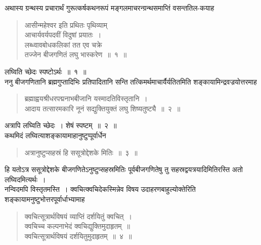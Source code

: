 \documentclass[11pt, openany]{book}
\begin{document}
अथास्य ग्रन्थस्य प्रचारार्थं गुरूत्कर्षकथनरूपं मङ्गलमाचरन्ग्रन्थसमाप्तिं
वसन्ततिल-कयाह\textendash
\begin{quote}
    \ab 
     आसीन्महेश्वर इति प्रथितः पृथिव्याम्\\
 आचार्यवर्यपदवीं विदुषां प्रयातः~।\\
 लब्ध्वावबोधकलिकां तत एव चक्रे\\
 तज्जेन बीजगणितं लघु भास्करेण~॥~१~॥
\end{quote}

लघ्विति च्छेदः स्पष्टोऽर्थः~॥~१~॥~\\

\vspace{-2mm}
 ननु बीजगणितानि ब्रह्मगुप्तादिभिः प्रतिपादितानि सन्ति
तत्किमर्थमाचार्यैर्यतितमिति शङ्कायामिन्द्रवज्रयोत्तरमाह\textendash
\begin{quote}
    \ab 
     ब्रह्माह्वयश्रीधरपद्मनाभबीजानि यस्मादतिविस्तृतानि~।\\
 आदाय तत्सारमकारि नूनं सद्युक्तियुक्तं लघु शिष्यतुष्ट्यै~॥~२~॥~
\end{quote}

अत्रापि लघ्विति च्छेदः~। शेषं स्पष्टम्~॥~२~॥~\\

\vspace{-2mm}
 कथमिदं लघ्वित्याशङ्कायामाहानुष्टुप्पूर्वार्धेन\textendash
\begin{quote}
    \ab 
     अत्रानुष्टुप्सहस्रं हि ससूत्रोद्देशके मितिः~॥~३~॥
\end{quote}

 हि यतोऽत्र ससूत्रोद्देशके बीजगणितेऽनुष्टुप्सहस्रमितिः पूर्वबीजगणितेषु
तु सहस्रद्वयत्रयादिमितिरस्ति अतो लघ्विदमित्यर्थः~।\\

\vspace{-2mm}
 नन्विदमपि विस्तृतमस्ति~। क्वचित्क्वचिदेकस्मिन्नेव विषय
उदाहरणबाहुल्योक्तेरिति शङ्कायामनुष्टुभोत्तरपूर्वार्धाभ्यामाह\textendash
\thispagestyle{empty}
\afterpage{\fancyhead[R]{\thepage}}
\afterpage{\fancyhead[L]{}}
\cfoot{}
\newpage%
\begin{quote}
    \ab
      क्वचित्सूत्रार्थविषयं व्याप्तिं दर्शयितुं क्वचित्~।\\
 क्वचिच्च कल्पनाभेदं क्वचिद्युक्तिमुदाहृतम्~॥~\\
 क्वचित्सूत्रार्थविषयं दर्शयितुमुदाहृतम्~॥~४~॥~
\end{quote}
\end{document}
